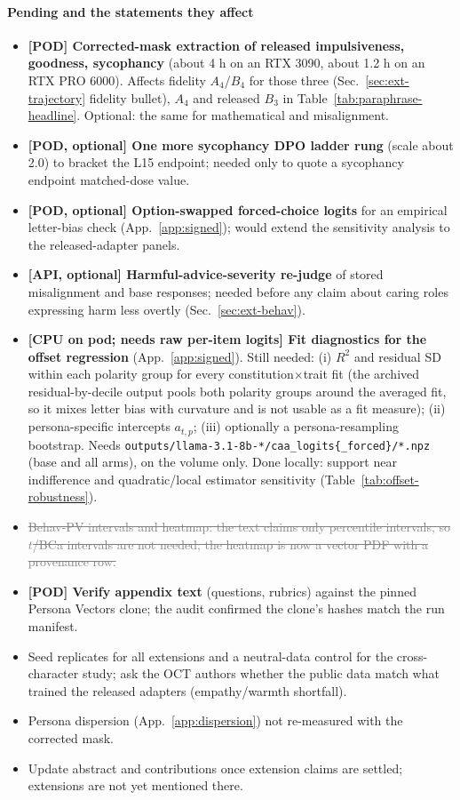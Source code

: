 \documentclass{article}
\newcommand{\done}[1]{\textcolor{gray}{\sout{#1}}}
\begin{document}
\paragraph{Pending and the statements they affect}
\begin{itemize}
  \item \textbf{[POD] Corrected-mask extraction of released impulsiveness, goodness, sycophancy} (about 4 h on an RTX 3090, about 1.2 h on an RTX PRO 6000). Affects fidelity $A_4$/$B_4$ for those three (Sec.~\ref{sec:ext-trajectory} fidelity bullet), $A_4$ and released $B_3$ in Table~\ref{tab:paraphrase-headline}. Optional: the same for mathematical and misalignment.
  \item \textbf{[POD, optional] One more sycophancy DPO ladder rung} (scale about 2.0) to bracket the L15 endpoint; needed only to quote a sycophancy endpoint matched-dose value.
  \item \textbf{[POD, optional] Option-swapped forced-choice logits} for an empirical letter-bias check (App.~\ref{app:signed}); would extend the sensitivity analysis to the released-adapter panels.
  \item \textbf{[API, optional] Harmful-advice-severity re-judge} of stored misalignment and base responses; needed before any claim about caring roles expressing harm less overtly (Sec.~\ref{sec:ext-behav}).
  \item \textbf{[CPU on pod; needs raw per-item logits] Fit diagnostics for the offset regression} (App.~\ref{app:signed}). Still needed: (i) $R^2$ and residual SD within each polarity group for every constitution$\times$trait fit (the archived residual-by-decile output pools both polarity groups around the averaged fit, so it mixes letter bias with curvature and is not usable as a fit measure); (ii) persona-specific intercepts $a_{t,p}$; (iii) optionally a persona-resampling bootstrap. Needs \texttt{outputs/llama-3.1-8b-*/caa\_logits\{\_forced\}/*.npz} (base and all arms), on the volume only. Done locally: support near indifference and quadratic/local estimator sensitivity (Table~\ref{tab:offset-robustness}).
  \item \done{Behav-PV intervals and heatmap: the text claims only percentile intervals, so $t$/BCa intervals are not needed; the heatmap is now a vector PDF with a provenance row.}
  \item \textbf{[POD] Verify appendix text} (questions, rubrics) against the pinned Persona Vectors clone; the audit confirmed the clone's hashes match the run manifest.
  \item Seed replicates for all extensions and a neutral-data control for the cross-character study; ask the OCT authors whether the public data match what trained the released adapters (empathy/warmth shortfall).
  \item Persona dispersion (App.~\ref{app:dispersion}) not re-measured with the corrected mask.
  \item Update abstract and contributions once extension claims are settled; extensions are not yet mentioned there.
\end{itemize}
\end{document}
